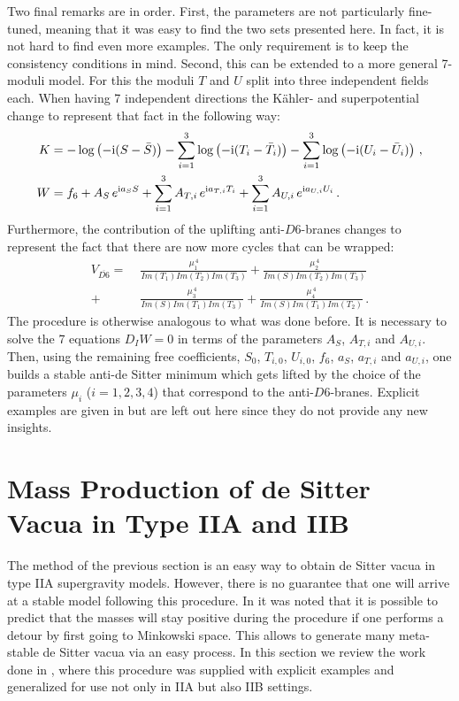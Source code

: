 \documentclass[a4paper,12pt]{report}
\newcommand{\bea}{\begin{equation}\begin{aligned}}
\newcommand{\eea}{\end{aligned}\end{equation}}
\def\rmi{{\rm i}}
\begin{document}
Two final remarks are in order. First, the parameters are not particularly fine-tuned, meaning that it was easy to find the two sets presented here. In fact, it is not hard to find even more examples. The only requirement is to keep the consistency conditions in mind. Second, this can be extended to a more general 7-moduli model. For this the moduli $T$ and $U$ split into three independent fields each. When having 7 independent directions the Kähler- and superpotential change to represent that fact in the following way:
\bea 
K&=  - \log\left(-\rmi (S-\bar{S})\right) - \sum_{i=1}^3  \log\left(-\rmi (T_i-\bar{T}_i)\right) - \sum_{i=1}^3 \log\left(-\rmi (U_i-\bar{U}_i)\right)\,,\\
W& = f_6 + A_{S}\, e^{\rmi a_S S} +  \sum_{i=1}^3 A_{T,i}\, e^{\rmi a_{T,i} T_i}+ \sum_{i=1}^3 A_{U,i}\, e^{\rmi a_{U,i} U_i}\,.
\eea
Furthermore, the contribution of the uplifting anti-$D6$-branes changes to represent the fact that there are now more cycles that can be wrapped:
\bea
V_{\overline{D6}} =\; &\frac{\mu_1^{\,4}}{Im(T_1)  Im(T_2)  Im(T_3)} +\frac{\mu_2^{\,4}}{Im(S)  Im(T_2)  Im(T_3)} \\+&\frac{\mu_3^{\,4}}{Im(S)  Im(T_1)  Im(T_3)} +\frac{\mu_4^{\,4}}{Im(S)  Im(T_1)  Im(T_2)}\,.
\eea
The procedure is otherwise analogous to what was done before. It is necessary to solve the 7 equations $D_IW=0$ in terms of the parameters $A_S$, $A_{T,i}$ and $A_{U,i}$. Then, using the remaining free coefficients, $S_0$, $T_{i,0}$, $U_{i,0}$, $f_6$, $a_S$, $a_{T,i}$ and $a_{U,i}$, one builds a stable anti-de Sitter minimum which gets lifted by the choice of the parameters $\mu_i$ ($i=1,2,3,4$) that correspond to the anti-$D6$-branes. Explicit examples are given in \cite{Cribiori:2019bfx} but are left out here since they do not provide any new insights.

\section{Mass Production of de Sitter Vacua in Type IIA and IIB}
\label{sec:massprod}
The method of the previous section is an easy way to obtain de Sitter vacua in type IIA supergravity models. However, there is no guarantee that one will arrive at a stable model following this procedure. In \cite{Kallosh:2019zgd} it was noted that it is possible to predict that the masses will stay positive during the procedure if one performs a detour by first going to Minkowski space. This allows to generate many meta-stable de Sitter vacua via an easy process. In this section we review the work done in \cite{Cribiori:2019drf}, where this procedure was supplied with explicit examples and generalized for use not only in IIA but also IIB settings.
\end{document}
